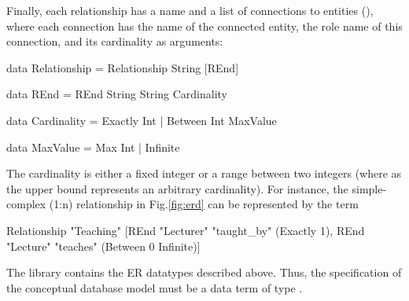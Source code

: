 Finally, each relationship has a name and a list of connections
to entities (), where each connection has the name
of the connected entity, the role name of this connection,
and its cardinality as arguments:
\begin{curry}
data Relationship = Relationship String [REnd]

data REnd = REnd String String Cardinality

data Cardinality = Exactly Int | Between Int MaxValue

data MaxValue = Max Int | Infinite
\end{curry}
The cardinality is either a fixed integer or a range between two
integers (where  as the upper bound represents an
arbitrary cardinality).
For instance, the simple-complex (1:n) relationship 
in Fig.\ref{fig:erd} can be represented by
the term
\begin{curry}
Relationship "Teaching"
             [REnd "Lecturer" "taught_by" (Exactly 1),
              REnd "Lecture" "teaches"    (Between 0 Infinite)]
\end{curry}
%
The \CYS library  contains the ER datatypes
described above. Thus, the specification of the
conceptual database model must be a data term of type
.
%
